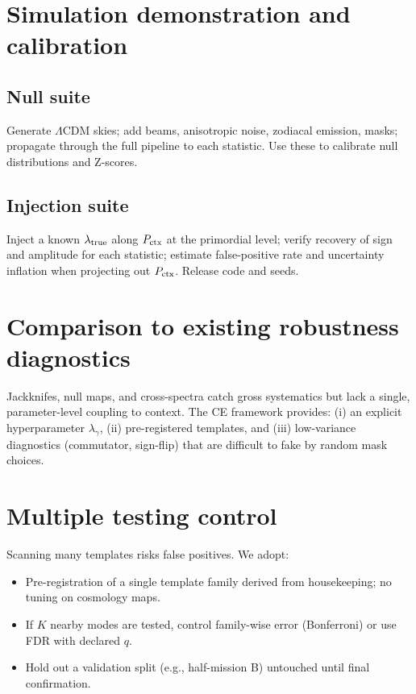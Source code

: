 \documentclass[11pt]{article}
\begin{document}
\section{Simulation demonstration and calibration}
\label{sec:sims}

\subsection{Null suite}
Generate $\Lambda$CDM skies; add beams, anisotropic noise, zodiacal emission, masks; propagate through the full pipeline to each statistic. Use these to calibrate null distributions and Z-scores.

\subsection{Injection suite}
Inject a known $\lambda_{\rm true}$ along $P_{\rm ctx}$ at the primordial level; verify recovery of sign and amplitude for each statistic; estimate false-positive rate and uncertainty inflation when projecting out $P_{\rm ctx}$. Release code and seeds.

\section{Comparison to existing robustness diagnostics}
\label{sec:robustness}

Jackknifes, null maps, and cross-spectra catch gross systematics but lack a single, parameter-level coupling to context. The CE framework provides: (i) an explicit hyperparameter $\lambda_\gamma$, (ii) pre-registered templates, and (iii) low-variance diagnostics (commutator, sign-flip) that are difficult to fake by random mask choices.

\section{Multiple testing control}
\label{sec:multiplicity}

Scanning many templates risks false positives. We adopt:
\begin{itemize}[leftmargin=*]
\item Pre-registration of a single template family derived from housekeeping; no tuning on cosmology maps.
\item If $K$ nearby modes are tested, control family-wise error (Bonferroni) or use FDR with declared $q$.
\item Hold out a validation split (e.g., half-mission B) untouched until final confirmation.
\end{itemize}
\end{document}
